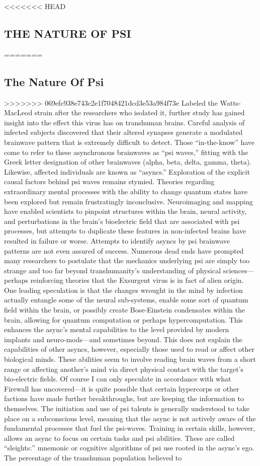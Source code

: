 <<<<<<< HEAD \subsection{THE NATURE OF PSI} ======= \subsection{The Nature Of Psi} >>>>>>> 069efc938e743c2e1f7048421dcd3e53a984f73e Labeled the Watts-MacLeod strain after the researchers who isolated it, further study has gained insight into the effect this virus has on transhuman brains. Careful analysis of infected subjects discovered that their altered synapses generate a modulated brainwave pattern that is extremely difficult to detect. Those “in-the-know” have come to refer to these asynchronous brainwaves as “psi waves,” fitting with the Greek letter designation of other brainwaves (alpha, beta, delta, gamma, theta). Likewise, affected individuals are known as “asyncs.” Exploration of the explicit causal factors behind psi waves remains stymied. Theories regarding extraordinary mental processes with the ability to change quantum states have been explored but remain frustratingly inconclusive. Neuroimaging and mapping have enabled scientists to pinpoint structures within the brain, neural activity, and perturbations in the brain’s bioelectric field that are associated with psi processes, but attempts to duplicate these features in non-infected brains have resulted in failure or worse. Attempts to identify asyncs by psi brainwave patterns are not even assured of success. Numerous dead ends have prompted many researchers to postulate that the mechanics underlying psi are simply too strange and too far beyond transhumanity’s understanding of physical sciences—perhaps reinforcing theories that the Exsurgent virus is in fact of alien origin. One leading speculation is that the changes wrought in the mind by infection actually entangle some of the neural sub-systems, enable some sort of quantum field within the brain, or possibly create Bose-Einstein condensates within the brain, allowing for quantum computation or perhaps hypercomputation. This enhances the async’s mental capabilities to the level provided by modern implants and neuro-mods—and sometimes beyond. This does not explain the capabilities of other asyncs, however, especially those used to read or affect other biological minds. These abilities seem to involve reading brain waves from a short range or affecting another’s mind via direct physical contact with the target’s bio-electric fields. Of course I can only speculate in accordance with what Firewall has uncovered—it is quite possible that certain hypercorps or other factions have made further breakthroughs, but are keeping the information to themselves. The initiation and use of psi talents is generally understood to take place on a subconscious level, meaning that the async is not actively aware of the fundamental processes that fuel the psi-waves. Training in certain skills, however, allows an async to focus on certain tasks and psi abilities. These are called “sleights:” mnemonic or cognitive algorithms of psi use rooted in the async’s ego. The percentage of the transhuman population believed to 